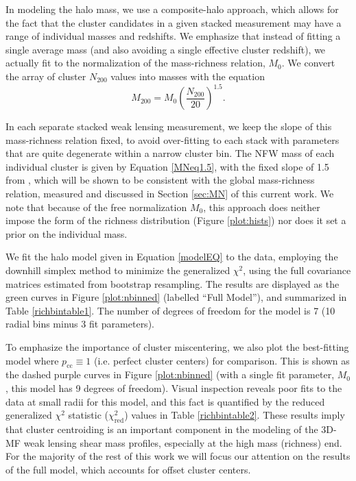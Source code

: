 In modeling the halo mass, we use a composite-halo approach, which allows for the fact that the cluster candidates in a given stacked measurement may have a range of individual masses and redshifts. We emphasize that instead of fitting a single average mass (and also avoiding a single effective cluster redshift), we actually fit to the normalization of the mass-richness relation, $M_0$. We convert the array of cluster $N_{200}$ values into masses with the equation
\begin{equation}
\label{MNeq1.5}
M_{200} = M_0 \left( \frac{N_{200}}{20} \right)^{1.5}.
\end{equation}

In each separate stacked weak lensing measurement, we keep the slope of this mass-richness relation fixed, to avoid over-fitting to each stack with parameters that are quite degenerate within a narrow cluster bin. The \ac{NFW} mass of each individual cluster is given by Equation \ref{MNeq1.5}, with the fixed slope of 1.5 from \citet{Ford14}, which will be shown to be consistent with the global mass-richness relation, measured and discussed in Section \ref{sec:MN} of this current work. We note that because of the free normalization $M_0$, this approach does neither impose the form of the richness distribution (Figure \ref{plot:hists}) nor does it set a prior on the individual mass.

We fit the halo model given in Equation \ref{modelEQ} to the data, employing the downhill simplex method to minimize the generalized $\chi^2$, using the full covariance matrices estimated from bootstrap resampling. The results are displayed as the green curves in Figure \ref{plot:nbinned} (labelled ``Full Model''), and summarized in Table \ref{richbintable1}. The number of degrees of freedom for the model is 7 (10 radial bins minus 3 fit parameters). 

To emphasize the importance of cluster miscentering, we also plot the best-fitting model where $p_{\mathrm{cc}} \equiv 1$ (i.e. perfect cluster centers) for comparison. This is shown as the dashed purple curves in Figure \ref{plot:nbinned} (with a single fit parameter, $M_0$, this model has 9 degrees of freedom). Visual inspection reveals poor fits to the data at small radii for this model, and this fact is quantified by the reduced generalized $\chi^2$ statistic ($\chi^2_{\mathrm{red}}$) values in Table \ref{richbintable2}. These results imply that cluster centroiding is an important component in the modeling of the \ac{3D-MF} weak lensing shear mass profiles, especially at the high mass (richness) end. For the majority of the rest of this work we will focus our attention on the results of the full model, which accounts for offset cluster centers.

